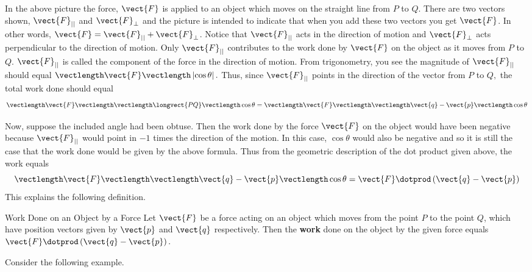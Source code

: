 In the above picture the force, $\vect{F}$ is applied to an object which moves
on the straight line from $P$ to $Q.$ There are two vectors shown, $\vect{F}_{||}$ and $\vect{F}_{\bot }$ and the
picture is intended to indicate that when you add these two vectors you get 
$\vect{F}$. In other words, $\vect{F} = \vect{F}_{||} + \vect{F}_{\bot}$. Notice that
 $\vect{F}_{||}$ acts in the direction of motion and 
$\vect{F}_{\bot }$ acts perpendicular to the direction of motion. Only 
$\vect{F}_{||}$ contributes to the work done by $\vect{F}$ on the object
as it moves from $P$ to $Q$. $\vect{F}_{||}$ is
called the component of the force in
 the direction of motion. From trigonometry, you
see the magnitude of $\vect{F}_{||}$ should equal $\vectlength \vect{F}
\vectlength \left| \cos \theta \right| .$ Thus, since $\vect{F}_{||}$ points
in the direction of the vector from $P$ to $Q,$
the total work done should equal
\begin{equation*}
\vectlength \vect{F}\vectlength \vectlength
\longvect{PQ}\vectlength \cos \theta =\vectlength
\vect{F}\vectlength \vectlength \vect{q}-\vect{p}\vectlength \cos \theta
\end{equation*}

Now, suppose the included angle had been obtuse. Then the work done by the force 
$\vect{F}$ on the object would have been negative because $\vect{F}_{||}$
would point in $-1$ times the direction of the motion.  In this case, $\cos \theta $ would also be negative and 
so it is still
the case that the work done would be given by the above formula. Thus from
the geometric description of the dot product given above, the work equals
\begin{equation*}
\vectlength \vect{F}\vectlength \vectlength \vect{q}-\vect{p}\vectlength \cos
\theta =\vect{F}\dotprod \left( \vect{q}-\vect{p}\right) 
\end{equation*}
This explains the following definition.

\begin{definition}{Work Done on an Object by a Force}\label{def:workdonebyforce}
Let $\vect{F}$ be a force acting on an object which moves from the point 
$P$ to the point $Q$, which have position vectors given by $\vect{p}$ and $\vect{q}$ respectively.
 Then the \textbf{work} done
 on the object by the given force equals $\vect{F}\dotprod \left(
\vect{q}-\vect{p}\right) .$
\end{definition}

Consider the following example.

